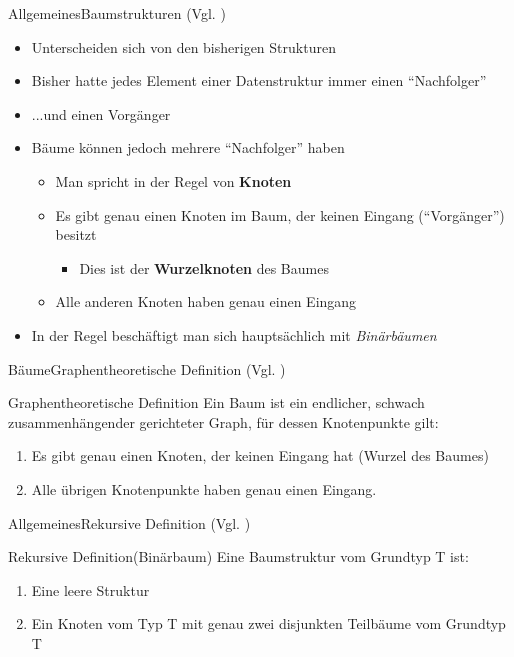 \begin{frame}{Allgemeines}{Baumstrukturen (Vgl. \cite{fahr:list})}
	\begin{itemize}
		\item Unterscheiden sich von den bisherigen Strukturen
		\item Bisher hatte jedes Element einer Datenstruktur immer einen "`Nachfolger"'
		\item ...und einen Vorgänger
		\item Bäume können jedoch mehrere "`Nachfolger"' haben
		\begin{itemize}
			\item Man spricht in der Regel von \textbf{Knoten}
			\item Es gibt genau einen Knoten im Baum, der keinen Eingang ("`Vorgänger"') besitzt
			\begin{itemize}
				\item Dies ist der \textbf{Wurzelknoten} des Baumes
			\end{itemize}
			\item Alle anderen Knoten haben genau einen Eingang
		\end{itemize}
		\item In der Regel beschäftigt man sich hauptsächlich mit \textit{Binärbäumen}
	\end{itemize}
\end{frame}

\begin{frame}{Bäume}{Graphentheoretische Definition (Vgl. \cite{fahr:list})}
	\vfill
	\begin{alertblock}{Graphentheoretische Definition}
	Ein Baum ist ein endlicher, schwach zusammenhängender gerichteter Graph, für dessen Knotenpunkte gilt:
	\begin{enumerate}
		\item Es gibt genau einen Knoten, der keinen Eingang hat (Wurzel des Baumes)
		\item Alle übrigen Knotenpunkte haben genau einen Eingang.
	\end{enumerate}
	\end{alertblock}
	\vfill
\end{frame}

\begin{frame}{Allgemeines}{Rekursive Definition (Vgl. \cite{fahr:list})}
	\vfill
	\begin{alertblock}{Rekursive Definition(Binärbaum)}
	Eine Baumstruktur vom Grundtyp T ist:
	\begin{enumerate}
		\item Eine leere Struktur
		\item Ein Knoten vom Typ T mit genau zwei disjunkten Teilbäume vom Grundtyp T
	\end{enumerate}
	\end{alertblock}
	\vfill
\end{frame}


